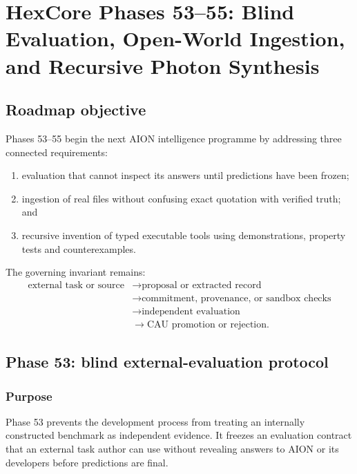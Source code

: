 \section{HexCore Phases 53--55: Blind Evaluation, Open-World Ingestion, and Recursive Photon Synthesis}
\label{sec:hexcore-phases-53-55}

\subsection{Roadmap objective}

Phases 53--55 begin the next AION intelligence programme by addressing three
connected requirements:
\begin{enumerate}
    \item evaluation that cannot inspect its answers until predictions have
    been frozen;
    \item ingestion of real files without confusing exact quotation with
    verified truth; and
    \item recursive invention of typed executable tools using demonstrations,
    property tests and counterexamples.
\end{enumerate}

The governing invariant remains:
\[
\begin{aligned}
\text{external task or source}
&\rightarrow \text{proposal or extracted record}\\
&\rightarrow \text{commitment, provenance, or sandbox checks}\\
&\rightarrow \text{independent evaluation}\\
&\rightarrow \text{CAU promotion or rejection}.
\end{aligned}
\]

\subsection{Phase 53: blind external-evaluation protocol}
\label{subsec:phase53-blind-evaluation}

\subsubsection{Purpose}

Phase 53 prevents the development process from treating an internally
constructed benchmark as independent evidence.  It freezes an evaluation
contract that an external task author can use without revealing answers to
AION or its developers before predictions are final.

